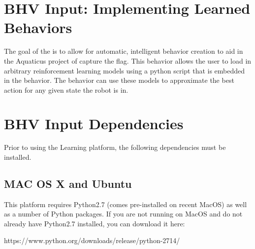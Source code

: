 \documentclass[onecolumn,letterpaper,11pt]{article}
\begin{document}
	
	\begin{labcover}
		\vspace{0.1in}
		\vspace{0.1in}
	\end{labcover}
	
	
	\section{BHV Input: Implementing Learned Behaviors}
	\label{bhvInput}
	
	The goal of the  is to allow for automatic, intelligent behavior creation to aid in the Aquaticus project of capture the flag. This behavior allows the user to load in arbitrary reinforcement learning models using a python script that is embedded in the behavior. The behavior can use these models to approximate the best action for any given state the robot is in. 
	
	\section{BHV Input Dependencies}
	
	Prior to using the  Learning platform, the following dependencies must be installed.
	
	\subsection{MAC OS X and Ubuntu}
	
	This platform requires Python2.7 (comes pre-installed on recent MacOS) as well
	as a number of Python packages. If you are not running on MacOS and do not
	already have Python2.7 installed, you can download it here:
	
	\vspace{0.15in}
	https://www.python.org/downloads/release/python-2714/
	\vspace{0.15in}
	
\end{document}
